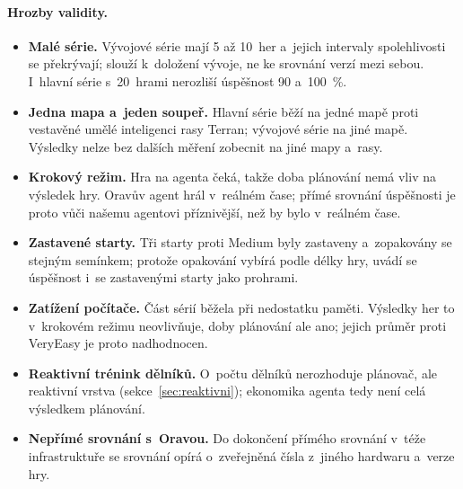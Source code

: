\paragraph{Hrozby validity.}
\begin{itemize}
	\item \textbf{Malé série.} Vývojové série mají 5 až 10~her a~jejich intervaly spolehlivosti se překrývají; slouží k~doložení vývoje, ne ke srovnání verzí mezi sebou. I~hlavní série s~20~hrami nerozliší úspěšnost 90 a~100~\%.
	\item \textbf{Jedna mapa a~jeden soupeř.} Hlavní série běží na jedné mapě proti vestavěné umělé inteligenci rasy Terran; vývojové série na jiné mapě. Výsledky nelze bez dalších měření zobecnit na jiné mapy a~rasy.
	\item \textbf{Krokový režim.} Hra na agenta čeká, takže doba plánování nemá vliv na výsledek hry. Oravův agent hrál v~reálném čase; přímé srovnání úspěšnosti je proto vůči našemu agentovi příznivější, než by bylo v~reálném čase.
	\item \textbf{Zastavené starty.} Tři starty proti Medium byly zastaveny a~zopakovány se stejným semínkem; protože opakování vybírá podle délky hry, uvádí se úspěšnost i~se zastavenými starty jako prohrami.
	\item \textbf{Zatížení počítače.} Část sérií běžela při nedostatku paměti. Výsledky her to v~krokovém režimu neovlivňuje, doby plánování ale ano; jejich průměr proti VeryEasy je proto nadhodnocen.
	\item \textbf{Reaktivní trénink dělníků.} O~počtu dělníků nerozhoduje plánovač, ale reaktivní vrstva (sekce~\ref{sec:reaktivni}); ekonomika agenta tedy není celá výsledkem plánování.
	\item \textbf{Nepřímé srovnání s~Oravou.} Do dokončení přímého srovnání v~téže infrastruktuře se srovnání opírá o~zveřejněná čísla z~jiného hardwaru a~verze hry.
\end{itemize}
